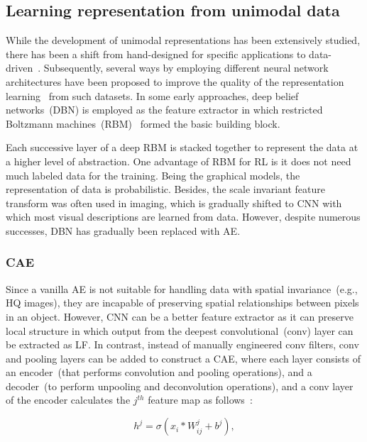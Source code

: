 \subsection{Learning representation from unimodal data}
While the development of unimodal representations has been extensively studied, there has been a shift from hand-designed for specific applications to data-driven~\cite{mmsurvey}. Subsequently, several ways by employing different neural network architectures have been proposed to improve the quality of the representation learning~\cite{min2018survey} from such datasets. In some early approaches, deep belief networks~(DBN) is employed as the feature extractor in which restricted Boltzmann machines~(RBM)~\cite{jaitly2011learning} formed the basic building block. 

\hspace*{3.5mm} Each successive layer of a deep RBM is stacked together to represent the data at a higher level of abstraction. One advantage of RBM for RL is it does not need much labeled data for the training. Being the graphical models, the representation of data is probabilistic. Besides, the scale invariant feature transform was often used in imaging, which is gradually shifted to CNN with which most visual descriptions are learned from data. However, despite numerous successes, DBN has gradually been replaced with AE. 

\subsubsection{CAE}
Since a vanilla AE is not suitable for handling data with spatial invariance~(e.g., HQ images), they are incapable of preserving spatial relationships between pixels in an object. However, CNN can be a better feature extractor as it can preserve local structure in which output from the deepest convolutional~(conv) layer can be extracted as LF. In contrast, instead of manually engineered conv filters, conv and pooling layers can be added to construct a CAE, where each layer consists of an encoder~(that performs convolution and pooling operations), and a decoder~(to perform unpooling and deconvolution operations), and a conv layer of the encoder calculates the $j^{th}$ feature map as follows~\cite{alirezaie2019semantic}:

\begin{equation}
    h^{j}=\sigma\left(x_{i} * W_{ij}^{j}+b^{j}\right),
\end{equation}

